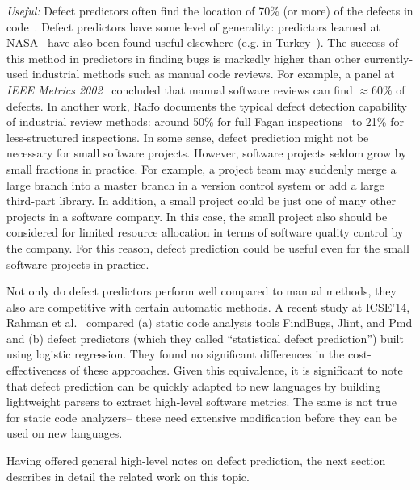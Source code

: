 {\em Useful:}
Defect predictors often  find the location of  70\% (or more)
of the defects in code~\cite{me07b}.
Defect predictors have some level of generality:
predictors learned at NASA~\cite{me07b} have also been found useful elsewhere
(e.g. in Turkey~\cite{tosun10,tosun09}).
The success of this method in  predictors in finding bugs is markedly
higher than other currently-used
industrial
methods such as manual code reviews. For example, 
a  panel at {\em IEEE Metrics
2002}~\cite{shu02} concluded that manual software  reviews can find ${\approx}60\%$ 
of defects.
In another work, 
Raffo documents the typical defect detection capability of
industrial review methods:   around 50\%
 for full Fagan inspections~\cite{fagan76} to
21\% for less-structured inspections.
In some sense, defect prediction might not be necessary for small software projects.
However, software projects seldom grow by small fractions in practice. For example, a project team may suddenly merge a large branch into a master branch in a version control system or add a large third-part library. In addition, a small project could be just one of many other projects in a software company. In this case, the small project also should be considered for limited resource allocation in terms of software quality control by the company. For this reason, defect prediction could be useful even for the small software projects in practice.

Not only do defect predictors perform well compared to manual methods,
they also are competitive with certain automatic methods.
A recent study at ICSE'14, Rahman et al.~\cite{rahman14:icse} compared
(a) static code analysis tools FindBugs, Jlint, and Pmd and (b) defect predictors
(which they called ``statistical defect prediction'') built using logistic regression.
They found  no significant differences in the cost-effectiveness
of these  approaches. Given this equivalence, it is significant to note that 
defect prediction can be quickly adapted to new languages by building lightweight
parsers to extract high-level software metrics. The same is not true for static code analyzers-- these need extensive modification before they can be used on new
languages.

Having offered general high-level notes on defect prediction,
the next section describes in detail the related work on this topic.
